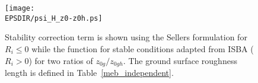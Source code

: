 %
%
%

\begin{figure}[!b]
\centerline{
\texttt{[image: \\EPSDIR/psi\_H\_z0-z0h.ps]}}
\caption{Stability correction term is shown using the Sellers formulation 
  for $R_i \leq 0$ while the function for stable conditions adapted
  from ISBA ($R_i > 0$) for two ratios of $z_{0g}/z_{0gh}$. The ground surface roughness length is
  defined in Table~\ref{meb_independent}.}
\label{fig:stab_cor_gc}
\end{figure}

